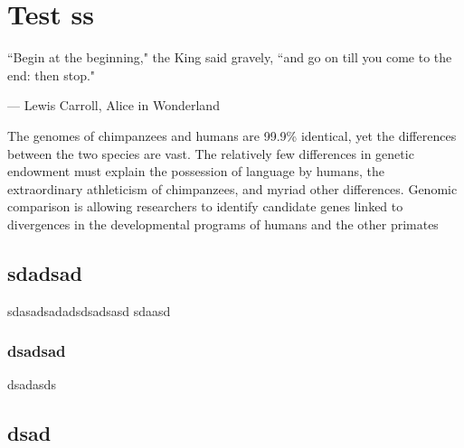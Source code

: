 \documentclass[]{subook}
\begin{document}
\lipsum[2-4]
\newpage
\chapter{Test ss}
 
    \epigraph{``Begin at the beginning," the King said gravely, ``and go on till you come to the end: then stop."}{--- \textup{Lewis Carroll}, Alice in Wonderland}

    The genomes of chimpanzees and humans are 99.9\% identical, yet the differences between the two species are vast. The relatively few differences in genetic endowment must explain the possession of language by humans, the extraordinary athleticism of chimpanzees, and myriad other differences. Genomic comparison is allowing researchers to identify candidate genes linked to divergences in the developmental programs of humans and the other primates



    \section{sdadsad}
    sdasadsadadsdsadsasd sdaasd
    \lipsum[1-3]
    \subsection{dsadsad}
    dsadasds
    \lipsum[1-4]
    \section{dsad}
    \lipsum[2-6]
\end{document}
